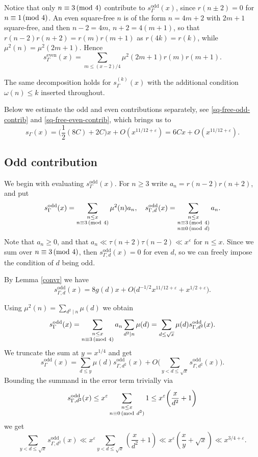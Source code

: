 \documentclass[12pt]{amsart}
\theoremstyle{remark}
\renewcommand{\pmod}[1]{\mkern3mu(\mathrm{mod}\ #1)}
\begin{document}
Notice that only $n \equiv 3 \pmod 4$ contribute to $s_{\Gamma}^{\text{odd}}(x)$, since $r(n \pm 2) = 0$
for $n \equiv 1 \pmod 4$. An even square-free $n$ is of the form $n = 4m+2$ with $2m+1$
square-free, and then $n-2 = 4m$, $n+2 = 4(m+1)$, so that $r(n-2)r(n+2) = r(m)r(m+1)$ as
$r(4k) = r(k)$, while $\mu^2(n) = \mu^2(2m+1)$. 
Hence
\[
    s_{\Gamma}^{\text{even}}(x) = \sum_{m \le (x-2)/4}\mu^2(2m+1)r(m)r(m+1).
\]

The same decomposition holds for $s_{\Gamma}^{(k)}(x)$ with the additional condition $\omega(n) \le  k$ inserted throughout.

Below we estimate the odd and even contributions separately, see \eqref{sq-free-odd-contrib} and \eqref{sq-free-even-contrib}, which brings us to
\[
    s_{\Gamma}(x) = \biggl(\frac{1}{2} (8C) + 2C\biggr)x + O(x^{11/12+\varepsilon}) = 6C x + O(x^{11/12+\varepsilon}).
\]

\subsection{Odd contribution}

We begin with evaluating $s_{\Gamma}^{\text{odd}}(x)$.
For $n \ge 3$ write $a_n = r(n-2)r(n+2)$, and put
\[
    s_{\Gamma}^{\text{odd}}(x) = \sum_{\substack{n \le x\\ n \equiv 3 \pmod 4}}\mu^2(n)a_n,\quad
    s_{\Gamma, d}^{\text{odd}}(x) = \sum_{\substack{n\le x\\ n \equiv 3 \pmod 4\\ n \equiv 0 \pmod d}} a_n.
\]
Note that $a_n \ge 0$, and that $a_n \ll \tau(n+2)\tau(n-2) \ll x^{\varepsilon}$ for $n \le x$. Since we sum over $n \equiv 3 \pmod 4$, then $s_{\Gamma, d}^{\text{odd}}(x) = 0$ for even $d$, so we can freely impose the condition of $d$ being odd.

By Lemma \ref{convr} we have
\[
    s_{\Gamma, d}^{\text{odd}}(x) = 8g(d)x+O\big(d^{-1/2}x^{11/12+\varepsilon}+x^{1/2+\varepsilon}\big).
\]

Using $\mu^2(n) = \sum_{d^2\mid n}\mu(d)$ we obtain
\[
    s_{\Gamma}^{\text{odd}}(x) = \sum_{\substack{n \le x \\ n \equiv 3 \pmod 4}} a_n \sum_{d^2 \mid n} \mu(d) = \sum_{d \le \sqrt{x}} \mu(d) s_{\Gamma, d^2}^{\text{odd}}(x).
\]
We truncate the sum at $y=x^{1/4}$ and get
\[
    s_{\Gamma}^{\text{odd}}(x) = \sum_{d \le y} \mu(d) s_{\Gamma, d^2}^{\text{odd}}(x) + O \biggl( \sum_{y < d \le \sqrt{x}} s_{\Gamma, d^2}^{\text{odd}}(x) \biggr).
\]
Bounding the summand in the error term trivially via
\[
    s_{\Gamma, d^2}^{\text{odd}}(x) \le x^\varepsilon \sum_{\substack{n \le x \\ n \equiv 0 \pmod {d^2}}} 1 \le x^\varepsilon \biggl(\frac{x}{d^2}+1 \biggr)
\]
we get
\[
    \sum_{y < d \le \sqrt x}s_{\Gamma, d^2}^{\text{odd}}(x) \ll  x^{\varepsilon} \sum_{y < d \le \sqrt x}\left(\frac{x}{d^2}+1\right)\ll x^{\varepsilon}\left(\frac xy+\sqrt x\right)\ll x^{3/4+\varepsilon}.
\]
\end{document}
